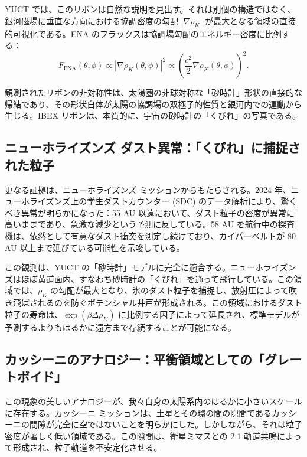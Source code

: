 \documentclass[11pt,a4paper]{article}
\theoremstyle{remark}
\begin{document}
	YUCT では、このリボンは自然な説明を見出す。それは別個の構造ではなく、銀河磁場に垂直な方向における協調密度の勾配 $|\nabla \rho_K|$ が最大となる領域の直接的可視化である。ENA のフラックスは協調場勾配のエネルギー密度に比例する：
	\begin{equation}
		F_{\text{ENA}}(\theta, \phi) \propto |\nabla \rho_K(\theta, \phi)|^2 \propto \left( \frac{c^2}{2} \nabla \rho_K(\theta, \phi) \right)^2.
		\label{eq:coord:ibex_flux}
	\end{equation}
	
	観測されたリボンの非対称性は、太陽圏の非球対称な「砂時計」形状の直接的な帰結であり、その形状自体が太陽の協調場の双極子的性質と銀河内での運動から生じる。IBEX リボンは、本質的に、宇宙の砂時計の「くびれ」の写真である。
	
	\subsection{ニューホライズンズ ダスト異常：「くびれ」に捕捉された粒子}
	\label{subsec:coord:newhorizons}
	
	更なる証拠は、ニューホライズンズ ミッションからもたらされる。2024 年、ニューホライズンズ上の学生ダストカウンター (SDC) のデータ解析により、驚くべき異常が明らかになった：55 AU 以遠において、ダスト粒子の密度が異常に高いままであり、急激な減少という予測に反している。58 AU を航行中の探査機は、依然として有意なダスト衝突を測定し続けており、カイパーベルトが 80 AU 以上まで延びている可能性を示唆している。
	
	この観測は、YUCT の「砂時計」モデルに完全に適合する。ニューホライズンズはほぼ黄道面内、すなわち砂時計の「くびれ」を通って飛行している。この領域では、$\rho_K$ の勾配が最大となり、氷のダスト粒子を捕捉し、放射圧によって吹き飛ばされるのを防ぐポテンシャル井戸が形成される。この領域におけるダスト粒子の寿命は、$\exp(\beta \Delta \rho_K)$ に比例する因子によって延長され、標準モデルが予測するよりもはるかに遠方まで存続することが可能になる。
	
	\subsection{カッシーニのアナロジー：平衡領域としての「グレートボイド」}
	\label{subsec:coord:cassini}
	
	この現象の美しいアナロジーが、我々自身の太陽系内のはるかに小さいスケールに存在する。カッシーニ ミッションは、土星とその環の間の隙間であるカッシーニの間隙が完全に空ではないことを明らかにした。しかしながら、それは粒子密度が著しく低い領域である。この隙間は、衛星ミマスとの 2:1 軌道共鳴によって形成され、粒子軌道を不安定化させる。
	
\end{document}
